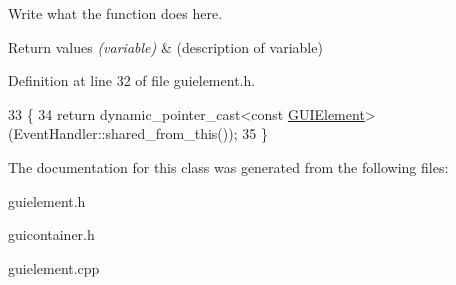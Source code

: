 Write what the function does here. 


\begin{DoxyRetVals}{Return values}
{\em (variable)} & (description of variable) \\
\hline
\end{DoxyRetVals}


Definition at line 32 of file guielement.\+h.


\begin{DoxyCode}
33         \{
34             \textcolor{keywordflow}{return} dynamic\_pointer\_cast<\textcolor{keyword}{const} \hyperlink{classGUIElement}{GUIElement}>(EventHandler::shared\_from\_this());
35         \}
\end{DoxyCode}


The documentation for this class was generated from the following files\+:\begin{DoxyCompactItemize}
\item 
guielement.\+h\item 
guicontainer.\+h\item 
guielement.\+cpp\end{DoxyCompactItemize}

